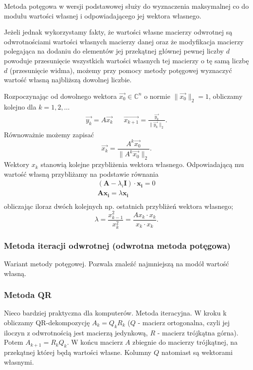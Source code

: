Metoda potęgowa w wersji podstawowej służy do wyznaczenia maksymalnej
co do modułu wartości własnej i odpowiadającego jej wektora własnego.

Jeżeli jednak wykorzystamy fakty, że wartości
własne macierzy odwrotnej są odwrotnościami wartości własnych macierzy danej
oraz że modyfikacja macierzy polegająca na dodaniu do elementów jej przekątnej głównej pewnej liczby $d$
powoduje przesunięcie wszystkich wartości własnych tej macierzy o tę samą liczbę $d$ (przesunięcie widma),
możemy przy pomocy metody potęgowej wyznaczyć wartość własną najbliższą dowolnej liczbie.


Rozpoczynając od dowolnego wektora $\overrightarrow{x_0}\in \mathbb{C}^n$
o normie $\lVert \overrightarrow{x_0} \rVert_2 = 1$, obliczamy kolejno dla $k=1,2,\ldots$
\begin{align*}
    \overrightarrow{y_k}=A\overrightarrow{x_k} & & \overrightarrow{x_{k+1}}=\frac{\overrightarrow{y_k}}{\lVert \overrightarrow{y_k} \rVert_2}.
\end{align*}
Równoważnie możemy zapisać
\[
    \overrightarrow{x_k}=\frac{A^k\overrightarrow{x_0}}{\lVert A^k\overrightarrow{x_0} \rVert_2}.
\]
Wektory $x_k$ stanowią kolejne przybliżenia wektora własnego.
Odpowiadającą mu wartość własną przybliżamy na podstawie równania
\begin{gather*}
(\mathbf{A}-\lambda_i\mathbf{I})
    \cdot\mathbf{x_i}=0\\
    \mathbf{A}\mathbf{x_i}=\lambda\mathbf{x_i}\\
\end{gather*}
obliczając iloraz dwóch kolejnych np. ostatnich przybliżeń wektora własnego;
\[
    \lambda=\frac{x_{k-1}^2}{x_k^2}=\frac{Ax_k\cdot x_k}{x_k \cdot x_k}.
\]

\subsubsection{Metoda iteracji odwrotnej (odwrotna metoda potęgowa)}

Wariant metody potęgowej.
Pozwala znaleźć najmniejszą na modół wartość własną.

\subsubsection{Metoda QR}
Nieco bardziej praktyczna dla komputerów.
Metoda iteracyjna.
W kroku k obliczamy QR-dekompozycję $A_k=Q_kR_k$
($Q$ - macierz ortogonalna, czyli jej iloczyn z odwrotnością jest macierzą jedynkową,
$R$ - macierz trójkątna górna). Potem $A_{k+1}=R_kQ_k$.
W końcu macierz $A$ zbiegnie do macierzy trójkątnej, na przekątnej której będą wartości własne.
Kolumny $Q$ natomiast są wektorami własnymi.
